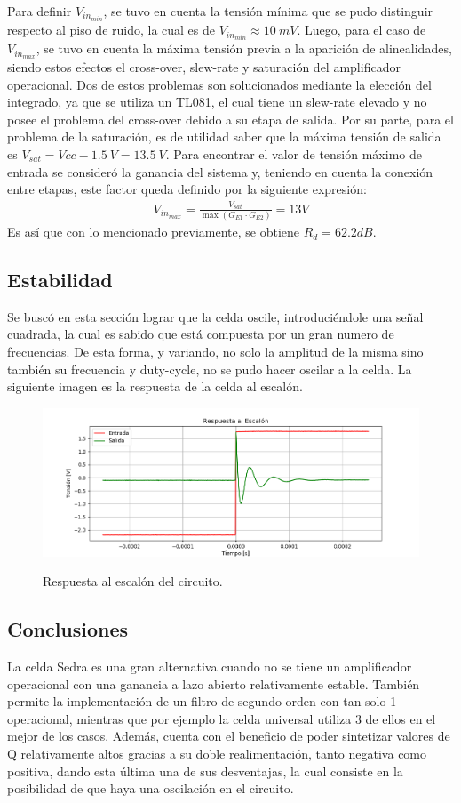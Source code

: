 Para definir $V_{in_{min}}$, se tuvo en cuenta la tensión mínima que se pudo distinguir respecto al piso de ruido, la cual es de $V_{in_{min}} \approx 10 \ mV$. Luego, para el caso de $V_{in_{max}}$, se tuvo en cuenta la máxima tensión previa a la aparición de alinealidades, siendo estos efectos el cross-over, slew-rate y saturación del amplificador operacional. Dos de estos problemas son solucionados mediante la elección del integrado, ya que se utiliza un TL081, el cual tiene un slew-rate elevado y no posee el problema del cross-over debido a su etapa de salida. Por su parte, para el problema de la saturación, es de utilidad saber que la máxima tensión de salida es $V_{sat} = Vcc - 1.5 \ V = 13.5 \ V$. Para encontrar el valor de tensión máximo de entrada se consideró la ganancia del sistema y, teniendo en cuenta la conexión entre etapas, este factor queda definido por la siguiente expresión:
\begin{align}
V_{in_{max}}=\frac{V_{sat}}{  \max(G_{E1} \cdot G_{E2} )} = 13V
\end{align}
Es así que con lo mencionado previamente, se obtiene $R_d = 62.2dB$.

\subsection{Estabilidad}
Se buscó en esta sección lograr que la celda oscile, introduciéndole una señal cuadrada, la cual es sabido que está compuesta por un gran numero de frecuencias. De esta forma, y variando, no solo la amplitud de la misma sino también su frecuencia y duty-cycle, no se pudo hacer oscilar a la celda. La siguiente imagen es la respuesta de la celda al escalón.
\begin{figure}[H]
	\centering
	\includegraphics[width=\textwidth]{Imagenes-Ej3/Step.png}
	\label{fig:stepresponse}
	\caption{Respuesta al escalón del circuito.}
\end{figure}

\subsection{Conclusiones}
La celda Sedra es una gran alternativa cuando no se tiene un amplificador operacional con una ganancia a lazo abierto relativamente estable. También permite la implementación de un filtro de segundo orden con tan solo 1 operacional, mientras que por ejemplo la celda universal utiliza 3 de ellos en el mejor de los casos. Además, cuenta con el beneficio de poder sintetizar valores de Q relativamente altos gracias a su doble realimentación, tanto negativa como positiva, dando esta última una de sus desventajas, la cual consiste en la posibilidad de que haya una oscilación en el circuito.